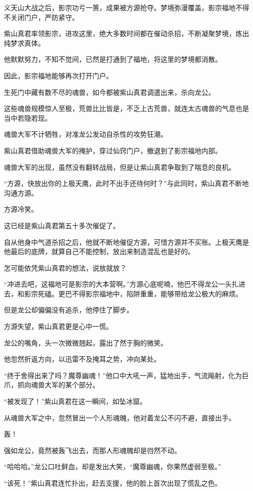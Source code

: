\begin{this_body}
义天山大战之后，影宗功亏一篑，成果被方源抢夺。梦境弥漫覆盖，影宗福地不得不关闭门户，严防紧守。

紫山真君率领影宗，进攻这里，绝大多数时间都在催动杀招，不断凝聚梦境，炼出纯梦求真体。

他默默努力，不知不觉间，已然是打通到了福地，将这里的梦境都消散。

因此，影宗福地能够再次打开门户。

生死门中藏有数不尽的魂兽，如今都被紫山真君调遣出来，杀向龙公。

这些魂兽规模惊人至极，荒兽比比皆是，不乏上古荒兽，就连太古魂兽的气息也是当中若隐若现。

魂兽大军不计牺牲，对准龙公发动自杀性的攻势狂潮。

紫山真君借助魂兽大军的掩护，穿过仙窍门户，撤退到了影宗福地内部。

魂兽大军的出现，虽然没有翻转战局，但是让紫山真君争取到了喘息的良机。

“方源，快放出你的上极天鹰，此时不出手还待何时？”与此同时，紫山真君不断地沟通方源。

方源冷笑。

这已经是紫山真君第五十多次催促了。

自从他身中气道杀招之后，他就不断地催促方源，可惜方源并不买账。上极天鹰是他最后的底牌，就算自己不能控制，放出来制造混乱也是好的。

怎可能依凭紫山真君的想法，说放就放？

“冲进去吧，这福地可是影宗的大本营啊。”方源心底呢喃，他巴不得龙公一头扎进去，和影宗死磕。更巴不得影宗福地中，陷阱重重，能够带给龙公极大的麻烦。

但是龙公却偏偏没有追杀，他停住了脚步。

方源失望，紫山真君更是心中一慌。

龙公的嘴角，头一次微微翘起，露出了然于胸的微笑。

他忽然折返方向，以迅雷不及掩耳之势，冲向某处。

“终于舍得出来了吗？魔尊幽魂！”他口中大吼一声，猛地出手，气流飚射，化为巨爪，抓向魂兽大军的某个部分。

“被发现了！”紫山真君在这一瞬间，如坠冰窟。

从魂兽大军之中，忽然冒出一个人形魂魄，他对着龙公不闪不避，直接出手。

轰！

强如龙公，竟然被轰飞出去，而那人形魂魄却是岿然不动。

“哈哈哈。”龙公口吐鲜血，却是发出大笑，“魔尊幽魂，你果然虚弱至极。”

“该死！”紫山真君连忙扑出，赶去支援，他的脸上首次出现了慌乱之色。


\end{this_body}
